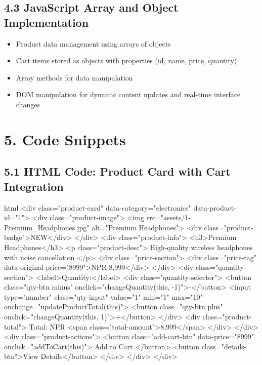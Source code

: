 \documentclass[a4paper,12pt]{article}
\begin{document}
\subsection*{4.3 JavaScript Array and Object Implementation}
\begin{itemize}
  \item Product data management using arrays of objects
  \item Cart items stored as objects with properties (id, name, price, quantity)
  \item Array methods for data manipulation
  \item DOM manipulation for dynamic content updates and real-time interface changes
\end{itemize}

\section*{5. Code Snippets}

\subsection*{5.1 HTML Code: Product Card with Cart Integration}
\begin{code}[fontsize=\small]{html}
<div class="product-card" data-category="electronics" data-product-id="1">
  <div class="product-image">
    <img src="assets/1-Premium_Headphones.jpg" alt="Premium Headphones">
    <div class="product-badge">NEW</div>
  </div>
  <div class="product-info">
    <h3>Premium Headphones</h3>
    <p class="product-desc">
      High-quality wireless headphones with noise cancellation
    </p>
    <div class="price-section">
      <div class="price-tag" data-original-price="8999">NPR 8,999</div>
    </div>
    <div class="quantity-section">
      <label>Quantity:</label>
      <div class="quantity-selector">
        <button class="qty-btn minus" onclick="changeQuantity(this, -1)">-</button>
        <input type="number" class="qty-input" value="1" min="1" max="10" onchange="updateProductTotal(this)">
        <button class="qty-btn plus" onclick="changeQuantity(this, 1)">+</button>
      </div>
      <div class="product-total">
        Total: NPR <span class="total-amount">8,999</span>
      </div>
    </div>
    <div class="product-actions">
      <button class="add-cart-btn" data-price="8999" onclick="addToCart(this)">
        Add to Cart
      </button>
      <button class="details-btn">View Details</button>
    </div>
  </div>
</div>

\end{code}
\end{document}
